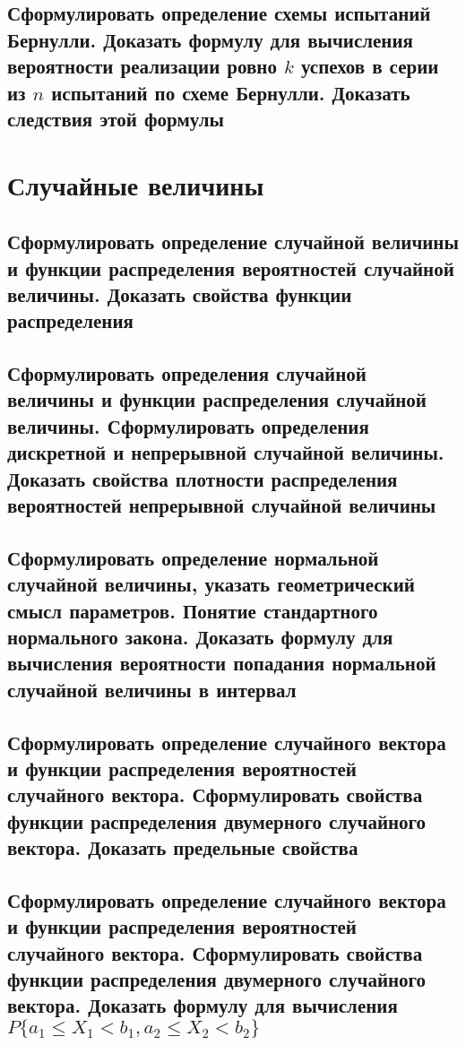 \documentclass[a4paper]{report}
\theoremstyle{indented}
\begin{document}
\section{Сформулировать определение схемы испытаний Бернулли.
Доказать формулу для вычисления вероятности реализации ровно $k$ успехов в серии из $n$ испытаний по схеме Бернулли.
Доказать следствия этой формулы}

\chapter{Случайные величины}

\section{Сформулировать определение случайной величины и функции распределения вероятностей случайной величины.
Доказать свойства функции распределения}

\section{Сформулировать определения случайной величины и функции распределения случайной величины.
Сформулировать определения дискретной и непрерывной случайной величины.
Доказать свойства плотности распределения вероятностей непрерывной случайной величины}

\section{Сформулировать определение нормальной случайной величины, указать геометрический смысл параметров.
Понятие стандартного нормального закона.
Доказать формулу для вычисления вероятности попадания нормальной случайной величины в интервал}

\section{Сформулировать определение случайного вектора и функции распределения вероятностей случайного вектора.
Сформулировать свойства функции распределения двумерного случайного вектора.
Доказать предельные свойства}

\section{Сформулировать определение случайного вектора и функции распределения вероятностей случайного вектора.
Сформулировать свойства функции распределения двумерного случайного вектора.
Доказать формулу для вычисления $P\{a_1 \leqslant X_1 < b_1, a_2 \leqslant X_2 < b_2\}$}
\end{document}
